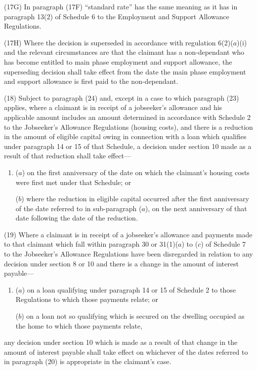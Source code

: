 \documentclass[12pt,a4paper]{article}
\begin{document}
(17G) In paragraph (17F) “standard rate” has the same meaning as it has in paragraph 13(2) of Schedule 6 to the Employment and Support Allowance Regulations.

\begin{sloppypar}
(17H) Where the decision is superseded in accordance with regulation 6(2)($a$)(i)  and the relevant circumstances are that the claimant has a non-dependant who has become entitled to main phase employment and support allowance, the superseding decision shall take effect from the date the main phase employment and support allowance is first paid to the non-dependant.
\end{sloppypar}

(18) Subject to paragraph (24) and, except in a case to which paragraph (23) applies, where a claimant is in receipt of a jobseeker’s allowance and his applicable amount includes an amount determined in accordance with Schedule 2 to the Jobseeker’s Allowance Regulations (housing costs), and there is a reduction in the amount of eligible capital owing in connection with a loan which qualifies under paragraph 14 or 15 of that Schedule, a decision under section 10 made as a result of that reduction shall take effect—
\begin{enumerate}\item[]
($a$) on the first anniversary of the date on which the claimant’s housing costs were first met under that Schedule; or

($b$) where the reduction in eligible capital occurred after the first anniversary of the date referred to in sub-paragraph ($a$), on the next anniversary of that date following the date of the reduction.
\end{enumerate}

(19) Where a claimant is in receipt of a jobseeker’s allowance and payments made to that claimant which fall within paragraph 30 or 31(1)($a$) to ($c$) of Schedule 7 to the Jobseeker’s Allowance Regulations have been disregarded in relation to any decision under section 8 or 10 and there is a change in the amount of interest payable—
\begin{enumerate}\item[]
($a$) on a loan qualifying under paragraph 14 or 15 of Schedule 2 to those Regulations to which those payments relate; or

($b$) on a loan not so qualifying which is secured on the dwelling occupied as the home to which those payments relate,
\end{enumerate}
any decision under section 10 which is made as a result of that change in the amount of interest payable shall take effect on whichever of the dates referred to in paragraph (20) is appropriate in the claimant’s case.
\end{document}
